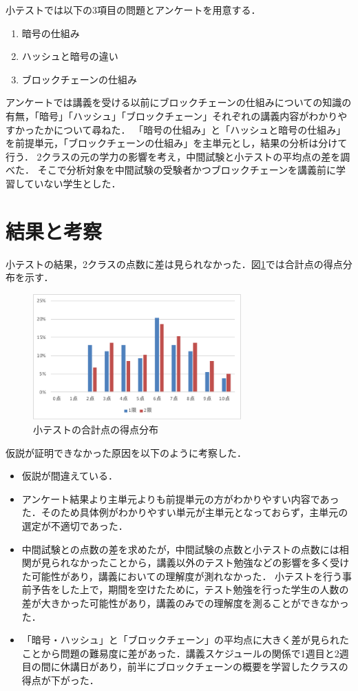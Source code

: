 \documentclass[twocolumn,10pt,a4j]{jsarticle}
\begin{document}
小テストでは以下の3項目の問題とアンケートを用意する．
\begin{enumerate}
\renewcommand {\labelenumi}{(\arabic{enumi})}
\item 暗号の仕組み
\item ハッシュと暗号の違い
\item ブロックチェーンの仕組み
\end{enumerate}

アンケートでは講義を受ける以前にブロックチェーンの仕組みについての知識の有無，「暗号」「ハッシュ」「ブロックチェーン」それぞれの講義内容がわかりやすかったかについて尋ねた．
「暗号の仕組み」と「ハッシュと暗号の仕組み」を前提単元，「ブロックチェーンの仕組み」を主単元とし，結果の分析は分けて行う．
2クラスの元の学力の影響を考え，中間試験と小テストの平均点の差を調べた．
そこで分析対象を中間試験の受験者かつブロックチェーンを講義前に学習していない学生とした．


\section{結果と考察}

小テストの結果，2クラスの点数に差は見られなかった．図\ref{fig:total}では合計点の得点分布を示す．

\begin{figure}[H]
\centering
\includegraphics[width=8cm]{total.pdf}
\caption{小テストの合計点の得点分布}
\label{fig:total}
\end{figure}

仮説が証明できなかった原因を以下のように考察した．
\begin{itemize}
\item 仮説が間違えている．
\item アンケート結果より主単元よりも前提単元の方がわかりやすい内容であった．そのため具体例がわかりやすい単元が主単元となっておらず，主単元の選定が不適切であった．
\item 中間試験との点数の差を求めたが，中間試験の点数と小テストの点数には相関が見られなかったことから，講義以外のテスト勉強などの影響を多く受けた可能性があり，講義においての理解度が測れなかった．
小テストを行う事前予告をした上で，期間を空けたために，テスト勉強を行った学生の人数の差が大きかった可能性があり，講義のみでの理解度を測ることができなかった．
\item 「暗号・ハッシュ」と「ブロックチェーン」の平均点に大きく差が見られたことから問題の難易度に差があった．講義スケジュールの関係で1週目と2週目の間に休講日があり，前半にブロックチェーンの概要を学習したクラスの得点が下がった．
\end{itemize}
\end{document}
